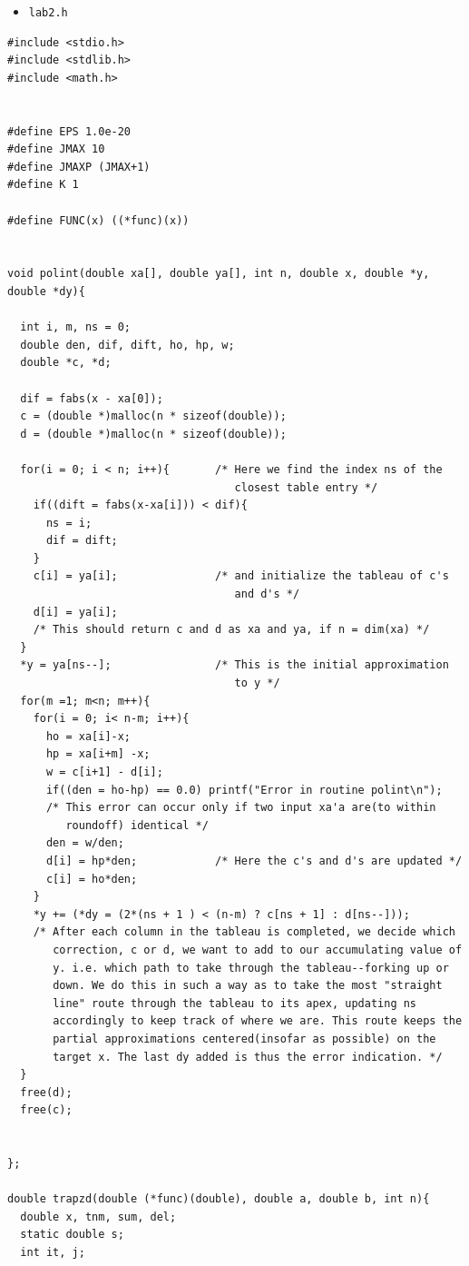 \documentclass{article}
\begin{document}
\begin{itemize}
\item \texttt{lab2.h}
\end{itemize}
\hline
\begin{verbatim}
#include <stdio.h>
#include <stdlib.h>
#include <math.h>


#define EPS 1.0e-20
#define JMAX 10
#define JMAXP (JMAX+1)
#define K 1

#define FUNC(x) ((*func)(x))


void polint(double xa[], double ya[], int n, double x, double *y, double *dy){

  int i, m, ns = 0;
  double den, dif, dift, ho, hp, w;
  double *c, *d;

  dif = fabs(x - xa[0]);
  c = (double *)malloc(n * sizeof(double));
  d = (double *)malloc(n * sizeof(double));

  for(i = 0; i < n; i++){       /* Here we find the index ns of the
                                   closest table entry */
    if((dift = fabs(x-xa[i])) < dif){
      ns = i;
      dif = dift;
    }
    c[i] = ya[i];               /* and initialize the tableau of c's
                                   and d's */
    d[i] = ya[i];
    /* This should return c and d as xa and ya, if n = dim(xa) */
  }
  *y = ya[ns--];                /* This is the initial approximation
                                   to y */
  for(m =1; m<n; m++){
    for(i = 0; i< n-m; i++){
      ho = xa[i]-x;
      hp = xa[i+m] -x;
      w = c[i+1] - d[i];
      if((den = ho-hp) == 0.0) printf("Error in routine polint\n");
      /* This error can occur only if two input xa'a are(to within
         roundoff) identical */
      den = w/den;
      d[i] = hp*den;            /* Here the c's and d's are updated */
      c[i] = ho*den;
    }
    *y += (*dy = (2*(ns + 1 ) < (n-m) ? c[ns + 1] : d[ns--]));
    /* After each column in the tableau is completed, we decide which
       correction, c or d, we want to add to our accumulating value of
       y. i.e. which path to take through the tableau--forking up or
       down. We do this in such a way as to take the most "straight
       line" route through the tableau to its apex, updating ns
       accordingly to keep track of where we are. This route keeps the
       partial approximations centered(insofar as possible) on the
       target x. The last dy added is thus the error indication. */
  }
  free(d);
  free(c);


};

double trapzd(double (*func)(double), double a, double b, int n){
  double x, tnm, sum, del;
  static double s;
  int it, j;


\end{verbatim}
\end{document}
